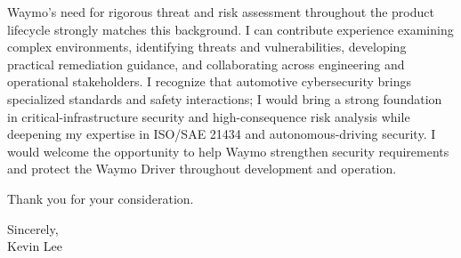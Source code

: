 \documentclass[12pt]{article}
\begin{document}
Waymo's need for rigorous threat and risk assessment throughout the product lifecycle strongly matches this background. I can contribute experience examining complex environments, identifying threats and vulnerabilities, developing practical remediation guidance, and collaborating across engineering and operational stakeholders. I recognize that automotive cybersecurity brings specialized standards and safety interactions; I would bring a strong foundation in critical-infrastructure security and high-consequence risk analysis while deepening my expertise in ISO/SAE 21434 and autonomous-driving security. I would welcome the opportunity to help Waymo strengthen security requirements and protect the Waymo Driver throughout development and operation.

Thank you for your consideration.

Sincerely,\\
Kevin Lee
\end{document}

